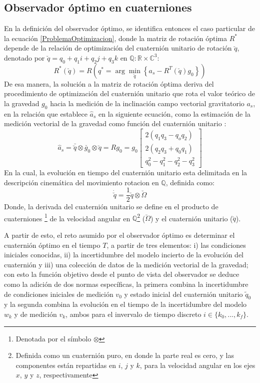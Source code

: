 \documentclass[conference]{IEEEtran}
\begin{document}
\subsection{Observador óptimo en cuaterniones}
En la definición del observador óptimo, se identifica entonces el caso particular de la ecuación \ref{ProblemaOptimizacion}, donde la matriz de rotación óptima $R^*$ depende de la relación de optimización del cuaternión unitario de rotación $\breve{q}$, denotado por $\breve{q}=q_0+q_1i+q_2j+q_3k$ en $\mathbb{Q}:\mathbb{R}\times\mathbb{C}^3$:
\begin{equation}\label{ProblemaOptimizacionAcc}
R^*(\breve{q})=R\left(q^*=\arg\min_{\breve{q}}\left\{a_s-R^T(\breve{q})g_0\right\}\right)
\end{equation} 
De esa manera, la solución a la matriz de rotación óptima deriva del procedimiento  de optimización del cuaternión unitario que rota el valor teórico de la gravedad $g_0$ hacia la medición de la inclinación campo vectorial gravitatorio $a_s$, en la relación que establece $\hat{a}_s$ en la siguiente ecuación, como la estimación de la medición vectorial de la gravedad como función del cuaternión unitario \cite{Sola2012}:
\begin{equation}\label{chap2:ModeloMedicion}
\hat{a}_s=\bar{\breve{q}}\otimes\breve{g_0}\otimes\breve{q}=Rg_0=g_0\begin{bmatrix}2(q_1q_3-q_oq_2)\\2(q_2q_3+q_0q_1)\\q_0^2-q_1^2-q_2^2-q_3^2\end{bmatrix}
\end{equation}
En la cual, la evolución en tiempo del cuaternión unitario esta delimitada en la descripción cinemática del movimiento rotacion en $\mathbb{Q}$, definida como:
\begin{equation}
\dot{\breve{q}}=\frac{1}{2}\breve{q}\otimes\breve{\Omega}
\end{equation}
Donde, la derivada del cuaternión unitario se define en el producto de cuaterniones \footnote{Denotada por el símbolo $\otimes$} de la velocidad angular en $\mathbb{Q}$\footnote{Definida como un cuaternión puro, en donde la parte real es cero, y las componentes están repartidas en $i$, $j$ y $k$, para la velocidad angular en los ejes $x$, $y$ y $z$, respectivamente} ($\breve{\Omega}$) y el cuaternión unitario ($\breve{q}$).\par
A partir de esto, el reto asumido por el observador óptimo es determinar el cuaternión óptimo en el tiempo $T$, a partir de tres elementos: i) las condiciones iniciales conocidas, ii) la incertidumbre del modelo incierto de la evolución del cuaternión y iii) una colección de datos de la medición vectorial de la gravedad; con esto la función objetivo desde el punto de vista del observador se deduce como la adición de dos normas específicas, la primera combina la incertidumbre de condiciones iniciales de medición $v_0$ y estado inicial del cuaternión unitario $\tilde{q}_0$ y la segunda combina la evolución en el tiempo de la incertidumbre del modelo $w_k$ y de medición $v_k$, ambos para el invervalo de  tiempo discreto $i\in\{k_0,...,k_f\}$.
\end{document}
